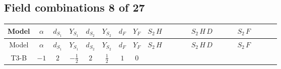 \documentclass[8pt]{article}
\begin{document}
\begin{landscape}
\subsection*{Field combinations 8 of 27}
\begin{longtable}{@{}cccccccc >{\raggedright\arraybackslash}p{0.21\linewidth} >{\raggedright\arraybackslash}p{0.21\linewidth} >{\raggedright\arraybackslash}p{0.21\linewidth}@{}}
\toprule
Model & $\alpha$ & $d_{S_1}$ & $Y_{S_1}$ & $d_{S_2}$ & $Y_{S_2}$ & $d_F$ & $Y_F$ & $S_2\,H$ & $S_2\,H\,D$ & $S_2\,F$ \\
\midrule
\endfirsthead
\toprule
Model & $\alpha$ & $d_{S_1}$ & $Y_{S_1}$ & $d_{S_2}$ & $Y_{S_2}$ & $d_F$ & $Y_F$ & $S_2\,H$ & $S_2\,H\,D$ & $S_2\,F$ \\
\midrule
\endhead
T3-B & $-1$ & $2$ & $-\frac{1}{2}$ & $2$ & $\frac{1}{2}$ & $1$ & $0$ & \scriptsize\adjustbox{max width=\linewidth}{$\begin{gathered} -\frac{C_{S_2^\dagger S_2} \hbar  H_{a_1} S_{2,j_1} H_{a_1}{}^{\dagger } S_{2,j_1}{}^{\dagger } g_2^4}{120 m_1^2} \\ +\frac{C_{S_2^\dagger S_2} \hbar  H_{a_2} S_{2,j_2} \mathcal{I}_{y_1,a_1,j_2} {\mathcal{C}_{LS_1F}}^{*}_{a_2,j_1} H_{a_1}{}^{\dagger } S_{2,j_1}{}^{\dagger } g_2^4}{60 m_1^2} \\ +\frac{\hbar  H_{a_1} H_{a_3} S_{2,j_2} \mathcal{I}_{y_1,a_2,j_2} {\mathcal{C}_{LS_1F}}^{*}_{a_3,j_1} H_{a_1}{}^{\dagger } H_{a_2}{}^{\dagger } S_{2,j_1}{}^{\dagger } \lambda_{HS_2}^{(1)}^{(1)} g_2^4}{60 m_1^2}\end{gathered}$} & \scriptsize\adjustbox{max width=\linewidth}{$\begin{gathered} -\frac{\hbar  H_{a_1} S_{2,j_1} D_{\mu _1}\left(H_{a_1}\right){}^{\dagger } D_{\mu _1}\left(S_{2,j_1}\right){}^{\dagger } g_2^4}{120 m_1^2} \\ +\frac{\hbar  H_{a_2} S_{2,j_2} \mathcal{I}_{y_1,a_1,j_2} {\mathcal{C}_{LS_1F}}^{*}_{a_2,j_1} D_{\mu _1}\left(H_{a_1}\right){}^{\dagger } D_{\mu _1}\left(S_{2,j_1}\right){}^{\dagger } g_2^4}{60 m_1^2} \\ -\frac{\hbar  H_{a_1} H_{a_1}{}^{\dagger } D_{\mu _1}\left(S_{2,j_1}\right){}^{\dagger } D_{\mu _1}\left(S_{2,j_1}\right) g_2^4}{120 m_1^2}\end{gathered}$} & \scriptsize\adjustbox{max width=\linewidth}{$\begin{gathered} -\frac{\hbar  \overline{y_{1,i_1,r_1}} F_{r_1}{}^T\, C\, P_L\, F_{r_2} g_1^2 M_F S_{2,j_1} y_{1,i_1,r_2} S_{2,j_1}{}^{\dagger }}{6 \epsilon  m_1^2} \\ -\frac{\hbar  \overline{y_{1,i_1,r_1}} F_{r_1}{}^T\, C\, P_L\, F_{r_2} g_1^2 M_F S_{2,j_1} y_{1,i_1,r_2} S_{2,j_1}{}^{\dagger }}{4 m_1^2} \\ -\frac{\hbar  \log \left(\frac{\bar{\mu}^{2}}{m_1^2}\right) \overline{y_{1,i_1,r_1}} F_{r_1}{}^T\, C\, P_L\, F_{r_2} g_1^2 M_F S_{2,j_1} y_{1,i_1,r_2} S_{2,j_1}{}^{\dagger }}{6 m_1^2}\end{gathered}$} \\

\end{longtable}
\end{landscape}
\end{document}

